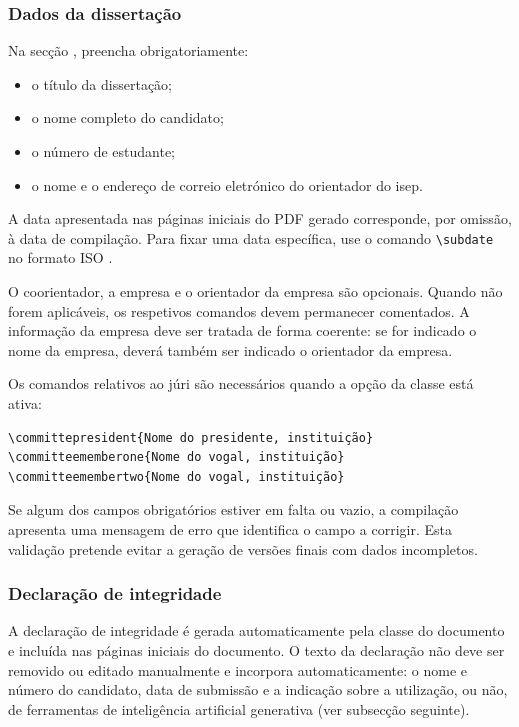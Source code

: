\subsubsection*{Dados da dissertação}

Na secção , preencha obrigatoriamente:

\begin{itemize}
\item o título da dissertação;
\item o nome completo do candidato;
\item o número de estudante;
\item o nome e o endereço de correio eletrónico do orientador do \ac{isep}.
\end{itemize}

A data apresentada nas páginas iniciais do PDF gerado corresponde, por omissão, à data de compilação. Para fixar uma data específica, use o comando \verb|\subdate| no formato ISO .

O coorientador, a empresa e o orientador da empresa são opcionais. Quando não forem aplicáveis, os respetivos comandos devem permanecer comentados. A informação da empresa deve ser tratada de forma coerente: se for indicado o nome da empresa, deverá também ser indicado o orientador da empresa.

Os comandos relativos ao júri são necessários quando a opção  da classe está ativa:
\begin{verbatim}
\committepresident{Nome do presidente, instituição}
\committeememberone{Nome do vogal, instituição}
\committeemembertwo{Nome do vogal, instituição}
\end{verbatim}

Se algum dos campos obrigatórios estiver em falta ou vazio, a compilação apresenta uma mensagem de erro que identifica o campo a corrigir. Esta validação pretende evitar a geração de versões finais com dados incompletos.

\subsubsection*{Declaração de integridade}

A declaração de integridade é gerada automaticamente pela classe do documento e incluída nas páginas iniciais do documento. O texto da declaração não deve ser removido ou editado manualmente e incorpora automaticamente: o nome e número do candidato, data de submissão e a indicação sobre a utilização, ou não, de ferramentas de inteligência artificial generativa (ver subsecção seguinte).

